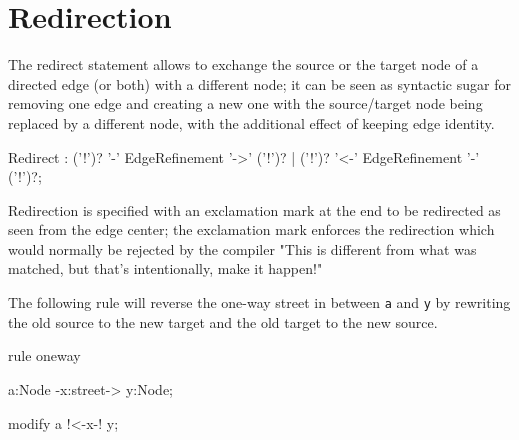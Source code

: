 \section{Redirection} \label{sec:redirect}

The redirect statement allows to exchange the source or the target node of a directed edge (or both) with a different node;
it can be seen as syntactic sugar for removing one edge and creating a new one with the source/target node being replaced by a different node, with the additional effect of keeping edge identity.

\begin{rail}
Redirect : ('!')? '-' EdgeRefinement '->' ('!')? | ('!')? '<-' EdgeRefinement '-' ('!')?;
\end{rail}

Redirection is specified with an exclamation mark at the end to be redirected as seen from the edge center;
the exclamation mark enforces the redirection which would normally be rejected by the compiler "This is different from what was matched, but that's intentionally, make it happen!"

\begin{example}
The following rule will reverse the one-way street in between \texttt{a} and \texttt{y} by rewriting the old source to the new target and the old target to the new source.
\begin{grgen}
rule oneway {
  a:Node -x:street-> y:Node;

  modify {
    a !<-x-! y;
  }
}
\end{grgen}
\end{example}


